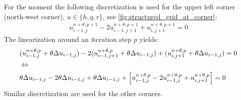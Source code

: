 For the moment the following discretization is used for the upper left corner (north-west corner), $u\in \{h,q,r\}$, see \autoref{fig:structured_grid_at_corner}:
%
\begin{align}
    u^{n+\theta,p+1}_{i-1, j} - 2  u^{n+\theta,p+1}_{i-1, j+1} + u^{n+\theta,p+1}_{i, j+1} = 0
    \nonumber
\end{align}
The linearization around an iteration step $p$ yields:
\begin{align}
   &(u^{n+\theta,p}_{i-1, j} + \theta \Delta u_{i-1, j}) - 2  (u^{n+\theta,p}_{i-1, j+1} + \theta \Delta u_{i-1, j}) + (u^{n+\theta,p}_{i, j+1} + \theta \Delta u_{i-1, j}) = 0
   \\
   &\Leftrightarrow
   \\
   &\theta \Delta u_{i-1, j} - 2 \theta \Delta u_{i-1, j} + \theta \Delta u_{i-1, j}
 + \left[u^{n+\theta,p}_{i-1, j} - 2u^{n+\theta,p}_{i-1, j} + u^{n+\theta,p}_{i, j+1} \right] = 0
    \end{align}
Similar discretization are used for the other corners.
%

